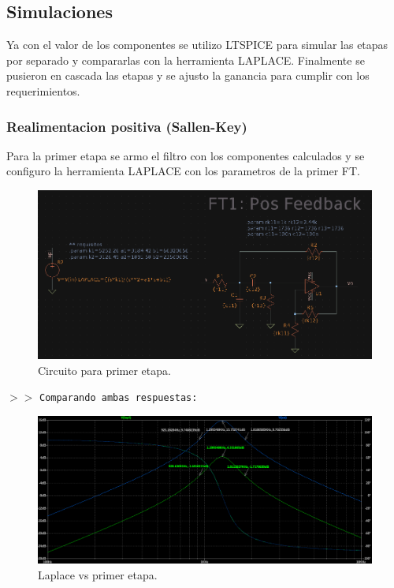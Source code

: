 \subsection{Simulaciones}

Ya con el valor de los componentes se utilizo LTSPICE para simular las etapas por separado y compararlas con la herramienta LAPLACE.
Finalmente se pusieron en cascada las etapas y se ajusto la ganancia para cumplir con los requerimientos.

\subsubsection{Realimentacion positiva (Sallen-Key)}

Para la primer etapa se armo el filtro con los componentes calculados y se configuro la herramienta LAPLACE con los parametros de la primer FT.

\begin{figure}[H]
    \centering
    \includegraphics[scale=.4]{Secciones/Circ1/img/schLpPos.png}
    \caption{Circuito para primer etapa.}
    \label{schPos}
\end{figure}

\noindent $>>$ \texttt{Comparando ambas respuestas:}

\begin{figure}[H]
    \centering
    \includegraphics[scale=.3]{Secciones/Circ1/img/lpVsPos.png}
    \caption{Laplace vs primer etapa.}
    \label{schPos}
\end{figure}


